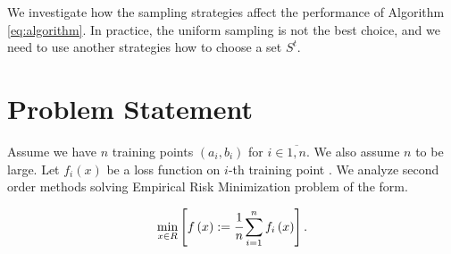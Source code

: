 \documentclass{article}
\begin{document}


We investigate how the sampling strategies affect the performance of Algorithm \eqref{eq:algorithm}. In practice, the uniform sampling is not the best choice, and we need to use another strategies how to choose a set $S^t$. 

\section{Problem Statement}

Assume we have $n$ training points $\left(a_i, b_i\right)$ for $i \in \overline{1, n}$. We also assume $n$ to be large. Let $f_i\left(x\right)$ be a loss function on $i$-th training point . We analyze second order methods solving Empirical Risk Minimization problem of the form.

\begin{equation}
    \min\limits_{x\in R} \left[f\left(x\right):=\cfrac{1}{n}\sum\limits_{i=1}^{n}f_i\left(x\right)\right].
\end{equation}

\newpage
 
 
\end{document}
